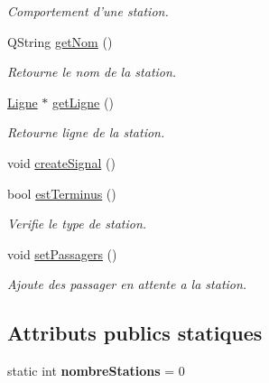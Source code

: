 \begin{DoxyCompactItemize}
\begin{DoxyCompactList}\small\item\em Comportement d'une station. \item\end{DoxyCompactList}\item 
QString \hyperlink{classStation_ac73e2b60d199734b494e84fa065a6643}{getNom} ()
\begin{DoxyCompactList}\small\item\em Retourne le nom de la station. \item\end{DoxyCompactList}\item 
\hyperlink{classLigne}{Ligne} $\ast$ \hyperlink{classStation_a3ee72b5920d69350770fa056d6b675bc}{getLigne} ()
\begin{DoxyCompactList}\small\item\em Retourne ligne de la station. \item\end{DoxyCompactList}\item 
void \hyperlink{classStation_a41ad1728246bbecd645a7a9679a2e59c}{createSignal} ()
\item 
bool \hyperlink{classStation_ad2c82ba6d816f24c26970c4468351807}{estTerminus} ()
\begin{DoxyCompactList}\small\item\em Verifie le type de station. \item\end{DoxyCompactList}\item 
\hypertarget{classStation_a81ea74879cf784be7f89153be99be03d}{
void \hyperlink{classStation_a81ea74879cf784be7f89153be99be03d}{setPassagers} ()}
\label{classStation_a81ea74879cf784be7f89153be99be03d}

\begin{DoxyCompactList}\small\item\em Ajoute des passager en attente a la station. \item\end{DoxyCompactList}\end{DoxyCompactItemize}
\subsection*{Attributs publics statiques}
\begin{DoxyCompactItemize}
\item 
\hypertarget{classStation_a0735f4fa937dd9018dedb764c3a2ee49}{
static int {\bfseries nombreStations} = 0}
\label{classStation_a0735f4fa937dd9018dedb764c3a2ee49}

\end{DoxyCompactItemize}


